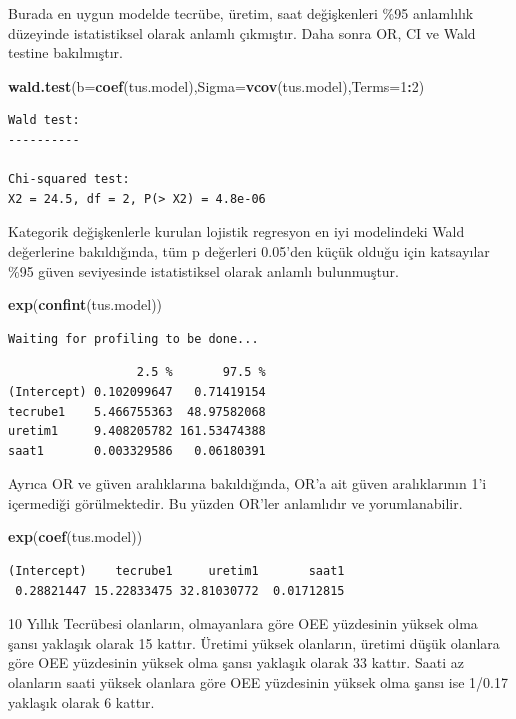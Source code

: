 \documentclass[12pt,twoside]{deuthesis}
\newenvironment{Shaded}{\begin{snugshade}}{\end{snugshade}}
\newcommand{\DataTypeTok}[1]{\textcolor[rgb]{0.13,0.29,0.53}{#1}}
\newcommand{\DecValTok}[1]{\textcolor[rgb]{0.00,0.00,0.81}{#1}}
\newcommand{\KeywordTok}[1]{\textcolor[rgb]{0.13,0.29,0.53}{\textbf{#1}}}
\newcommand{\NormalTok}[1]{#1}
\newcommand{\OperatorTok}[1]{\textcolor[rgb]{0.81,0.36,0.00}{\textbf{#1}}}
\begin{document}
Burada en uygun modelde tecrübe, üretim, saat değişkenleri \%95 anlamlılık düzeyinde istatistiksel olarak anlamlı çıkmıştır. Daha sonra OR, CI ve Wald testine bakılmıştır.
\begin{Shaded}
\begin{Highlighting}[]
\KeywordTok{wald.test}\NormalTok{(}\DataTypeTok{b=}\KeywordTok{coef}\NormalTok{(tus.model),}\DataTypeTok{Sigma=}\KeywordTok{vcov}\NormalTok{(tus.model),}\DataTypeTok{Terms=}\DecValTok{1}\OperatorTok{:}\DecValTok{2}\NormalTok{)}
\end{Highlighting}
\end{Shaded}
\begin{verbatim}
Wald test:
----------

Chi-squared test:
X2 = 24.5, df = 2, P(> X2) = 4.8e-06
\end{verbatim}
Kategorik değişkenlerle kurulan lojistik regresyon en iyi modelindeki Wald değerlerine bakıldığında, tüm p değerleri 0.05'den küçük olduğu için katsayılar \%95 güven seviyesinde istatistiksel olarak anlamlı bulunmuştur.
\begin{Shaded}
\begin{Highlighting}[]
\KeywordTok{exp}\NormalTok{(}\KeywordTok{confint}\NormalTok{(tus.model))}
\end{Highlighting}
\end{Shaded}
\begin{verbatim}
Waiting for profiling to be done...
\end{verbatim}
\begin{verbatim}
                  2.5 %       97.5 %
(Intercept) 0.102099647   0.71419154
tecrube1    5.466755363  48.97582068
uretim1     9.408205782 161.53474388
saat1       0.003329586   0.06180391
\end{verbatim}
Ayrıca OR ve güven aralıklarına bakıldığında, OR'a ait güven aralıklarının 1'i içermediği görülmektedir. Bu yüzden OR'ler anlamlıdır ve yorumlanabilir.
\begin{Shaded}
\begin{Highlighting}[]
\KeywordTok{exp}\NormalTok{(}\KeywordTok{coef}\NormalTok{(tus.model))}
\end{Highlighting}
\end{Shaded}
\begin{verbatim}
(Intercept)    tecrube1     uretim1       saat1 
 0.28821447 15.22833475 32.81030772  0.01712815 
\end{verbatim}
10 Yıllık Tecrübesi olanların, olmayanlara göre OEE yüzdesinin yüksek olma şansı yaklaşık olarak 15 kattır. Üretimi yüksek olanların, üretimi düşük olanlara göre OEE yüzdesinin yüksek olma şansı yaklaşık olarak 33 kattır. Saati az olanların saati yüksek olanlara göre OEE yüzdesinin yüksek olma şansı ise 1/0.17 yaklaşık olarak 6 kattır.
\end{document}
